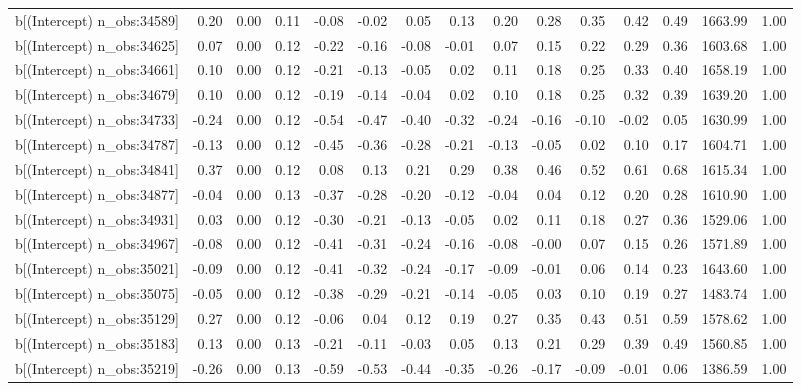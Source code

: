 \begin{table}[ht]
\begin{tabular}{rrrrrrrrrrrrrrr}
  b[(Intercept) n\_obs:34589] & 0.20 & 0.00 & 0.11 & -0.08 & -0.02 & 0.05 & 0.13 & 0.20 & 0.28 & 0.35 & 0.42 & 0.49 & 1663.99 & 1.00 \\ 
  b[(Intercept) n\_obs:34625] & 0.07 & 0.00 & 0.12 & -0.22 & -0.16 & -0.08 & -0.01 & 0.07 & 0.15 & 0.22 & 0.29 & 0.36 & 1603.68 & 1.00 \\ 
  b[(Intercept) n\_obs:34661] & 0.10 & 0.00 & 0.12 & -0.21 & -0.13 & -0.05 & 0.02 & 0.11 & 0.18 & 0.25 & 0.33 & 0.40 & 1658.19 & 1.00 \\ 
  b[(Intercept) n\_obs:34679] & 0.10 & 0.00 & 0.12 & -0.19 & -0.14 & -0.04 & 0.02 & 0.10 & 0.18 & 0.25 & 0.32 & 0.39 & 1639.20 & 1.00 \\ 
  b[(Intercept) n\_obs:34733] & -0.24 & 0.00 & 0.12 & -0.54 & -0.47 & -0.40 & -0.32 & -0.24 & -0.16 & -0.10 & -0.02 & 0.05 & 1630.99 & 1.00 \\ 
  b[(Intercept) n\_obs:34787] & -0.13 & 0.00 & 0.12 & -0.45 & -0.36 & -0.28 & -0.21 & -0.13 & -0.05 & 0.02 & 0.10 & 0.17 & 1604.71 & 1.00 \\ 
  b[(Intercept) n\_obs:34841] & 0.37 & 0.00 & 0.12 & 0.08 & 0.13 & 0.21 & 0.29 & 0.38 & 0.46 & 0.52 & 0.61 & 0.68 & 1615.34 & 1.00 \\ 
  b[(Intercept) n\_obs:34877] & -0.04 & 0.00 & 0.13 & -0.37 & -0.28 & -0.20 & -0.12 & -0.04 & 0.04 & 0.12 & 0.20 & 0.28 & 1610.90 & 1.00 \\ 
  b[(Intercept) n\_obs:34931] & 0.03 & 0.00 & 0.12 & -0.30 & -0.21 & -0.13 & -0.05 & 0.02 & 0.11 & 0.18 & 0.27 & 0.36 & 1529.06 & 1.00 \\ 
  b[(Intercept) n\_obs:34967] & -0.08 & 0.00 & 0.12 & -0.41 & -0.31 & -0.24 & -0.16 & -0.08 & -0.00 & 0.07 & 0.15 & 0.26 & 1571.89 & 1.00 \\ 
  b[(Intercept) n\_obs:35021] & -0.09 & 0.00 & 0.12 & -0.41 & -0.32 & -0.24 & -0.17 & -0.09 & -0.01 & 0.06 & 0.14 & 0.23 & 1643.60 & 1.00 \\ 
  b[(Intercept) n\_obs:35075] & -0.05 & 0.00 & 0.12 & -0.38 & -0.29 & -0.21 & -0.14 & -0.05 & 0.03 & 0.10 & 0.19 & 0.27 & 1483.74 & 1.00 \\ 
  b[(Intercept) n\_obs:35129] & 0.27 & 0.00 & 0.12 & -0.06 & 0.04 & 0.12 & 0.19 & 0.27 & 0.35 & 0.43 & 0.51 & 0.59 & 1578.62 & 1.00 \\ 
  b[(Intercept) n\_obs:35183] & 0.13 & 0.00 & 0.13 & -0.21 & -0.11 & -0.03 & 0.05 & 0.13 & 0.21 & 0.29 & 0.39 & 0.49 & 1560.85 & 1.00 \\ 
  b[(Intercept) n\_obs:35219] & -0.26 & 0.00 & 0.13 & -0.59 & -0.53 & -0.44 & -0.35 & -0.26 & -0.17 & -0.09 & -0.01 & 0.06 & 1386.59 & 1.00 \\ 

\end{tabular}
\end{table}
